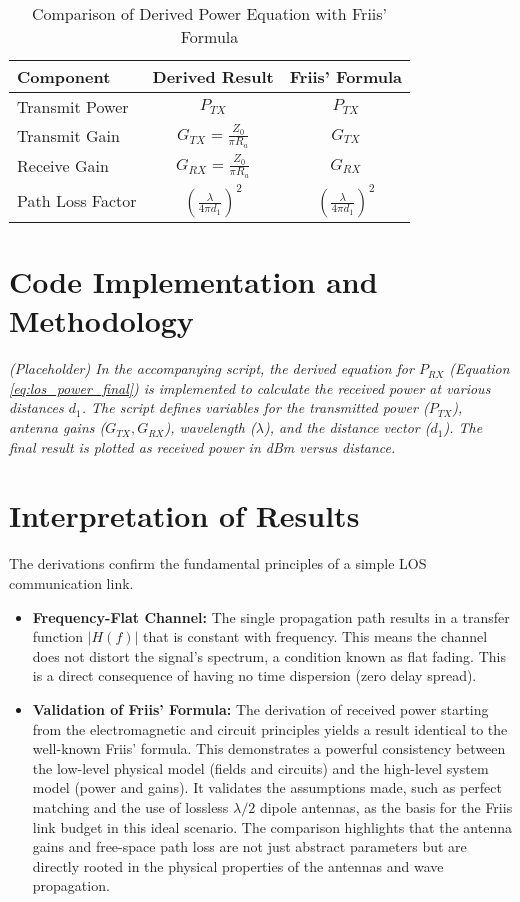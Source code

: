 \begin{table}[H]
	\centering
	\caption{Comparison of Derived Power Equation with Friis' Formula}
	\label{tab:friis_comparison}
	\begin{tabular}{|l|c|c|}
		\hline
		\textbf{Component} & \textbf{Derived Result} & \textbf{Friis' Formula} \\ \hline
		Transmit Power & $P_{TX}$ & $P_{TX}$ \\ \hline
		Transmit Gain & $G_{TX} = \frac{Z_0}{\pi R_a}$ & $G_{TX}$ \\ \hline
		Receive Gain & $G_{RX} = \frac{Z_0}{\pi R_a}$ & $G_{RX}$ \\ \hline
		Path Loss Factor & $\left(\frac{\lambda}{4\pi d_1}\right)^2$ & $\left(\frac{\lambda}{4\pi d_1}\right)^2$ \\ \hline
	\end{tabular}
\end{table}

\section{Code Implementation and Methodology}
\textit{(Placeholder) In the accompanying script, the derived equation for $P_{RX}$ (Equation \ref{eq:los_power_final}) is implemented to calculate the received power at various distances $d_1$. The script defines variables for the transmitted power ($P_{TX}$), antenna gains ($G_{TX}, G_{RX}$), wavelength ($\lambda$), and the distance vector ($d_1$). The final result is plotted as received power in dBm versus distance.}

\section{Interpretation of Results}
The derivations confirm the fundamental principles of a simple LOS communication link.
\begin{itemize}
	\item \textbf{Frequency-Flat Channel:} The single propagation path results in a transfer function $|H(f)|$ that is constant with frequency. This means the channel does not distort the signal's spectrum, a condition known as flat fading. This is a direct consequence of having no time dispersion (zero delay spread).
	\item \textbf{Validation of Friis' Formula:} The derivation of received power starting from the electromagnetic and circuit principles yields a result identical to the well-known Friis' formula. This demonstrates a powerful consistency between the low-level physical model (fields and circuits) and the high-level system model (power and gains). It validates the assumptions made, such as perfect matching and the use of lossless $\lambda/2$ dipole antennas, as the basis for the Friis link budget in this ideal scenario. The comparison highlights that the antenna gains and free-space path loss are not just abstract parameters but are directly rooted in the physical properties of the antennas and wave propagation.
\end{itemize}
